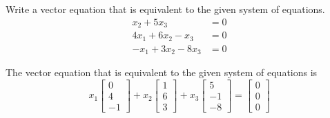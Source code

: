 \documentclass{../mathhomework}
\begin{document}
\begin{problem}[1.3\#9]
    Write a vector equation that is equivalent to the given system of equations.
    \begin{align*}
        x_2 + 5x_3 &= 0 \\
        4x_1 + 6x_2 - x_3 &= 0 \\
        -x_1 + 3x_2 - 8x_3 &= 0
    \end{align*}

    \begin{solution}
        The vector equation that is equivalent to the given system of equations is
        \begin{equation*}
            x_1 \begin{bmatrix}
                0 \\ 4 \\ -1
            \end{bmatrix} + x_2 \begin{bmatrix}
                1 \\ 6 \\ 3
            \end{bmatrix} + x_3 \begin{bmatrix}
                5 \\ -1 \\ -8
            \end{bmatrix} = \begin{bmatrix}
                0 \\ 0 \\ 0
            \end{bmatrix}
        \end{equation*}
    \end{solution}
\end{problem}
\end{document}
